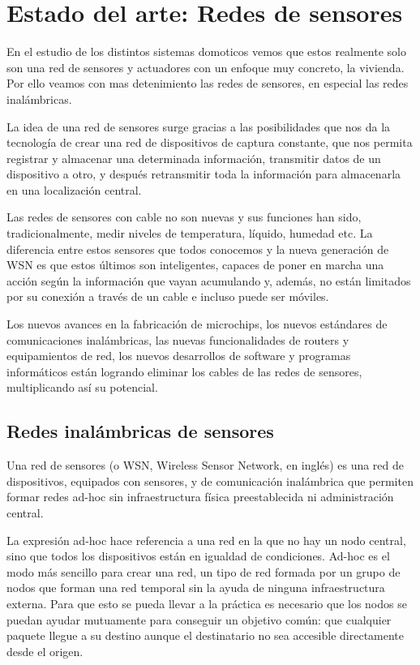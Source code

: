 \chapter{Estado del arte: Redes de sensores}

En el estudio de los distintos sistemas domoticos vemos que estos realmente solo son una red de sensores y actuadores
con un enfoque muy concreto, la vivienda. Por ello veamos con mas detenimiento las redes de sensores, en especial las
redes inal\'ambricas.

La idea de una red de sensores surge gracias a las posibilidades que nos da la tecnolog\'ia de crear una red de
dispositivos de captura constante, que nos permita registrar y almacenar una determinada informaci\'on, transmitir datos
de un dispositivo a otro, y despu\'es retransmitir toda la informaci\'on para almacenarla en una localizaci\'on central.

Las redes de sensores con cable no son nuevas y sus funciones han sido, tradicionalmente, medir niveles de temperatura,
l\'iquido, humedad etc. La diferencia entre estos sensores que todos conocemos y la nueva generaci\'on de WSN es que estos
\'ultimos son inteligentes, capaces de poner en marcha una acci\'on seg\'un la informaci\'on que vayan acumulando y, adem\'as, no
est\'an limitados por su conexi\'on a trav\'es de un cable e incluso puede ser m\'oviles. 

Los nuevos avances en la fabricaci\'on de microchips, los nuevos est\'andares de comunicaciones inal\'ambricas, las nuevas
funcionalidades de routers y equipamientos de red, los nuevos desarrollos de software y programas inform\'aticos est\'an
logrando eliminar los cables de las redes de sensores, multiplicando as\'i su potencial.

\section{Redes inal\'ambricas de sensores} 

Una red de sensores (o WSN, Wireless Sensor Network, en ingl\'es) es una red de dispositivos, equipados con sensores, y de
comunicaci\'on inal\'ambrica que permiten formar redes ad-hoc sin infraestructura f\'isica preestablecida ni administraci\'on
central.


La expresi\'on ad-hoc hace referencia a una red en la que no hay un nodo central, sino que todos los dispositivos est\'an en
igualdad de condiciones. Ad-hoc es el modo m\'as sencillo para crear una red, un tipo de red formada por un grupo de
nodos que forman una red temporal sin la ayuda de ninguna infraestructura externa. Para que esto se pueda llevar a la
pr\'actica es necesario que los nodos se puedan ayudar mutuamente para conseguir un objetivo com\'un: que cualquier paquete
llegue a su destino aunque el destinatario no sea accesible directamente desde el origen.


